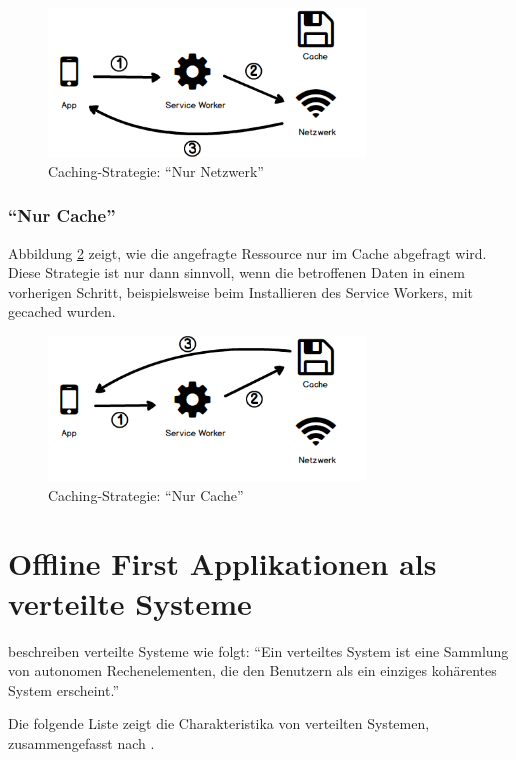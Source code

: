 \documentclass[a4paper, 12pt]{scrreprt}
\begin{document}
\begin{figure}[H]
	\centering
	\includegraphics[width=0.75\textwidth]{networkonly.png}
	\caption{Caching-Strategie: \enquote{Nur Netzwerk}}
	\label{fig:cachingNetworkOnly}
\end{figure}

\subsubsection{\enquote{Nur Cache}}
Abbildung \ref{fig:cachingCacheOnly} zeigt, wie die angefragte Ressource nur im Cache abgefragt wird. Diese Strategie ist nur dann sinnvoll, wenn die betroffenen Daten in einem vorherigen Schritt, beispielsweise beim Installieren des Service Workers, mit gecached wurden.

\begin{figure}[H]
	\centering
	\includegraphics[width=0.75\textwidth]{cacheonly.png}
	\caption{Caching-Strategie: \enquote{Nur Cache}}
	\label{fig:cachingCacheOnly}
\end{figure}

\section{Offline First Applikationen als verteilte Systeme}\label{sec:OfflineFirstVerteiteSysteme}
\citet{ArticleDistributedSystems} beschreiben verteilte Systeme wie folgt: \enquote{Ein verteiltes System ist eine Sammlung von autonomen Rechenelementen, die den Benutzern als ein einziges kohärentes System erscheint.}

Die folgende Liste zeigt die Charakteristika von verteilten Systemen, zusammengefasst nach \citet{BookDistributedSystemsDefinition}.
\end{document}
